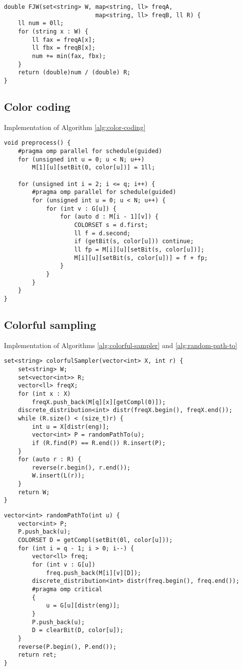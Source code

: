 \begin{lstlisting}
double FJW(set<string> W, map<string, ll> freqA,
                          map<string, ll> freqB, ll R) {
	ll num = 0ll;
	for (string x : W) {
		ll fax = freqA[x];
		ll fbx = freqB[x];
		num += min(fax, fbx);
	}
	return (double)num / (double) R;
}
\end{lstlisting}

\clearpage
\subsection*{Color coding}

Implementation of Algorithm \ref{alg:color-coding}

\begin{lstlisting}
void preprocess() {
	#pragma omp parallel for schedule(guided)
	for (unsigned int u = 0; u < N; u++)
		M[1][u][setBit(0, color[u])] = 1ll;
	
	for (unsigned int i = 2; i <= q; i++) {
		#pragma omp parallel for schedule(guided)
		for (unsigned int u = 0; u < N; u++) {
			for (int v : G[u]) {
				for (auto d : M[i - 1][v]) {
					COLORSET s = d.first;
					ll f = d.second;
					if (getBit(s, color[u])) continue;
					ll fp = M[i][u][setBit(s, color[u])];
					M[i][u][setBit(s, color[u])] = f + fp;
				}
			}
		}
	}
}
\end{lstlisting}

\clearpage
\subsection*{Colorful sampling}

Implementation of Algorithms \ref{alg:colorful-sampler} and \ref{alg:random-path-to}

\begin{lstlisting}
set<string> colorfulSampler(vector<int> X, int r) {
	set<string> W;
	set<vector<int>> R;
	vector<ll> freqX;
	for (int x : X) 
		freqX.push_back(M[q][x][getCompl(0)]);
	discrete_distribution<int> distr(freqX.begin(), freqX.end());
	while (R.size() < (size_t)r) {
		int u = X[distr(eng)];
		vector<int> P = randomPathTo(u);
		if (R.find(P) == R.end()) R.insert(P);
	}
	for (auto r : R) {
		reverse(r.begin(), r.end());
		W.insert(L(r));
	}
	return W;
}
\end{lstlisting}

\begin{lstlisting}
vector<int> randomPathTo(int u) {
	vector<int> P;
	P.push_back(u);
	COLORSET D = getCompl(setBit(0l, color[u]));
	for (int i = q - 1; i > 0; i--) {
		vector<ll> freq;
		for (int v : G[u]) 
			freq.push_back(M[i][v][D]);
		discrete_distribution<int> distr(freq.begin(), freq.end());
		#pragma omp critical
		{
			u = G[u][distr(eng)];
		}
		P.push_back(u);
		D = clearBit(D, color[u]);
	}
	reverse(P.begin(), P.end());
	return ret;
}
\end{lstlisting}
\clearpage
